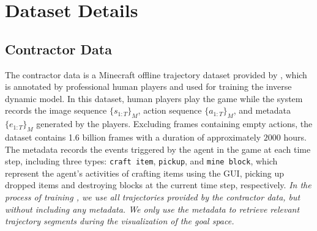 \documentclass[11pt, a4paper, logo, one column]{craftjarvis}
\begin{document}
\begin{table}[h]
\footnotesize
\caption{\textbf{Ablation on the number of condition slots.} } \label{tab:ablation_slots}
\renewcommand\arraystretch{1.1}
\end{table}


\section{Dataset Details} \label{appendix:dataset}

\subsection{Contractor Data}

The contractor data is a Minecraft offline trajectory dataset provided by \cite{vpt} , which is annotated by professional human players and used for training the inverse dynamic model. In this dataset, human players play the game while the system records the image sequence $\{s_{1:T}\}_{M}$, action sequence $\{a_{1:T}\}_{M}$, and metadata $\{e_{1:T}\}_{M}$ generated by the players. Excluding frames containing empty actions, the dataset contains 1.6 billion frames with a duration of approximately $2000$ hours. The metadata records the events triggered by the agent in the game at each time step, including three types: \texttt{craft item}, \texttt{pickup}, and \texttt{mine block}, which represent the agent's activities of crafting items using the GUI, picking up dropped items and destroying blocks at the current time step, respectively. \emph{In the process of training \agent, we use all trajectories provided by the contractor data, but without including any metadata. We only use the metadata to retrieve relevant trajectory segments during the visualization of the goal space. }
\end{document}
